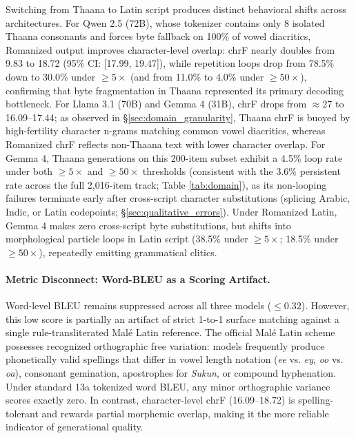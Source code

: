 \documentclass[acmsmall,review,anonymous]{acmart}
\begin{document}
Switching from Thaana to Latin script produces distinct behavioral shifts across architectures. For Qwen 2.5 (72B), whose tokenizer contains only 8 isolated Thaana consonants and forces byte fallback on 100\% of vowel diacritics, Romanized output improves character-level overlap: chrF nearly doubles from 9.83 to 18.72 (95\% CI: [17.99, 19.47]), while repetition loops drop from 78.5\% down to 30.0\% under $\ge 5\times$ (and from 11.0\% to 4.0\% under $\ge 50\times$), confirming that byte fragmentation in Thaana represented its primary decoding bottleneck. For Llama 3.1 (70B) and Gemma 4 (31B), chrF drops from $\approx$27 to 16.09--17.44; as observed in \S\ref{sec:domain_granularity}, Thaana chrF is buoyed by high-fertility character n-grams matching common vowel diacritics, whereas Romanized chrF reflects non-Thaana text with lower character overlap. For Gemma 4, Thaana generations on this 200-item subset exhibit a 4.5\% loop rate under both $\ge 5\times$ and $\ge 50\times$ thresholds (consistent with the 3.6\% persistent rate across the full 2,016-item track; Table \ref{tab:domain}), as its non-looping failures terminate early after cross-script character substitutions (splicing Arabic, Indic, or Latin codepoints; \S\ref{sec:qualitative_errors}). Under Romanized Latin, Gemma 4 makes zero cross-script byte substitutions, but shifts into morphological particle loops in Latin script (38.5\% under $\ge 5\times$; 18.5\% under $\ge 50\times$), repeatedly emitting grammatical clitics.

\paragraph{Metric Disconnect: Word-BLEU as a Scoring Artifact.}
Word-level BLEU remains suppressed across all three models ($\leq 0.32$). However, this low score is partially an artifact of strict 1-to-1 surface matching against a single rule-transliterated Mal\'{e} Latin reference. The official Mal\'{e} Latin scheme possesses recognized orthographic free variation: models frequently produce phonetically valid spellings that differ in vowel length notation (\textit{ee} vs. \textit{ey}, \textit{oo} vs. \textit{oa}), consonant gemination, apostrophes for \textit{Sukun}, or compound hyphenation. Under standard 13a tokenized word BLEU, any minor orthographic variance scores exactly zero. In contrast, character-level chrF (16.09--18.72) is spelling-tolerant and rewards partial morphemic overlap, making it the more reliable indicator of generational quality.
\end{document}
